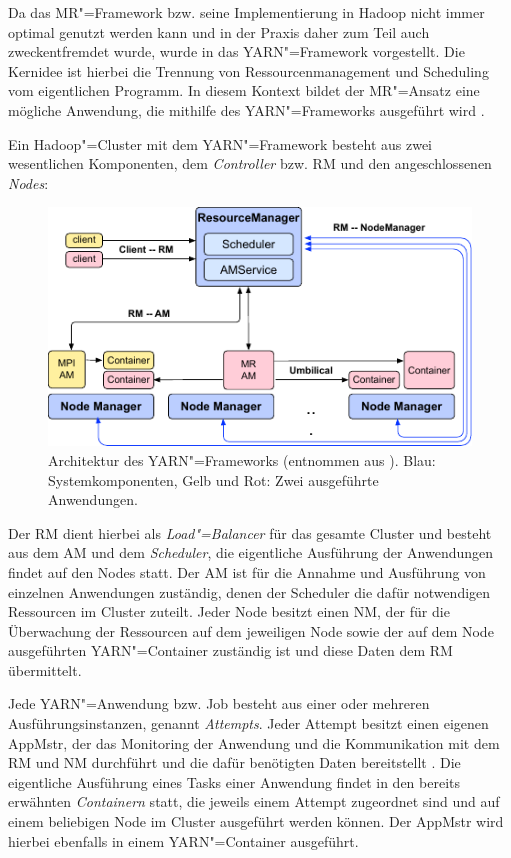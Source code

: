 Da das \gls{MR}"=Framework bzw. seine Implementierung in Hadoop nicht immer optimal genutzt werden kann und in der Praxis daher zum Teil auch zweckentfremdet wurde, wurde in \cite{Vavilapalli2013} das YARN"=Framework vorgestellt.
Die Kernidee ist hierbei die Trennung von Ressourcenmanagement und Scheduling vom eigentlichen Programm.
In diesem Kontext bildet der \gls{MR}"=Ansatz eine mögliche Anwendung, die mithilfe des YARN"=Frameworks ausgeführt wird \cite{Vavilapalli2013}.

Ein Hadoop"=Cluster mit dem YARN"=Framework besteht aus zwei wesentlichen Komponenten, dem \emph{Controller} bzw. \gls{RM} und den angeschlossenen \emph{Nodes}:

\begin{figure}[h]
    \includegraphics{./resources/yarnArchitecture.pdf}
    \caption[Architektur des YARN"=Frameworks]
    {Architektur des YARN"=Frameworks (entnommen aus \cite{Vavilapalli2013}).
    Blau: Systemkomponenten, Gelb und Rot: Zwei ausgeführte Anwendungen.}
    \label{fig:yarnarch}
\end{figure}

Der \gls{RM} dient hierbei als \emph{Load"=Balancer} für das gesamte Cluster und besteht aus dem \gls{AM} und dem \emph{Scheduler}, die eigentliche Ausführung der Anwendungen findet auf den Nodes statt.
Der \gls{AM} ist für die Annahme und Ausführung von einzelnen Anwendungen zuständig, denen der Scheduler die dafür notwendigen Ressourcen im Cluster zuteilt.
Jeder Node besitzt einen \gls{NM}, der für die Überwachung der Ressourcen auf dem jeweiligen Node sowie der auf dem Node ausgeführten YARN"=Container zuständig ist und diese Daten dem \gls{RM} übermittelt.

Jede YARN"=Anwendung bzw. Job besteht aus einer oder mehreren Ausführungsinstanzen, genannt \emph{Attempts}.
Jeder Attempt besitzt einen eigenen \gls{AppMstr}, der das Monitoring der Anwendung und die Kommunikation mit dem \gls{RM} und \gls{NM} durchführt und die dafür benötigten Daten bereitstellt \cite{HadoopYarnArch271}.
Die eigentliche Ausführung eines Tasks einer Anwendung findet in den bereits erwähnten \emph{Containern} statt, die jeweils einem Attempt zugeordnet sind und auf einem beliebigen Node im Cluster ausgeführt werden können.
Der \gls{AppMstr} wird hierbei ebenfalls in einem YARN"=Container ausgeführt.

